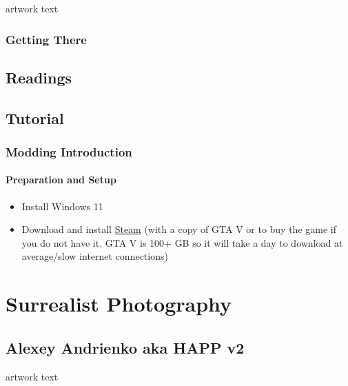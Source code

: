 \documentclass[
  openany]{book}
\begin{document}
artwork text

\hypertarget{getting-there-5}{%
\subsection{Getting There}\label{getting-there-5}}

\hypertarget{readings-3}{%
\section{Readings}\label{readings-3}}

\hypertarget{tutorial-3}{%
\section{Tutorial}\label{tutorial-3}}

\hypertarget{modding-introduction}{%
\subsection{Modding Introduction}\label{modding-introduction}}

\hypertarget{preparation-and-setup}{%
\subsubsection{Preparation and Setup}\label{preparation-and-setup}}

\begin{itemize}
\item
  Install Windows 11
\item
  Download and install \href{https://store.steampowered.com/about/}{Steam} (with a copy of GTA V or to buy the game if you do not have it. GTA V is 100+ GB so it will take a day to download at average/slow internet connections)
\end{itemize}

\hypertarget{surrealist-photography}{%
\chapter{Surrealist Photography}\label{surrealist-photography}}

\hypertarget{alexey-andrienko-aka-happ-v2}{%
\section{Alexey Andrienko aka HAPP v2}\label{alexey-andrienko-aka-happ-v2}}

artwork text
\end{document}
